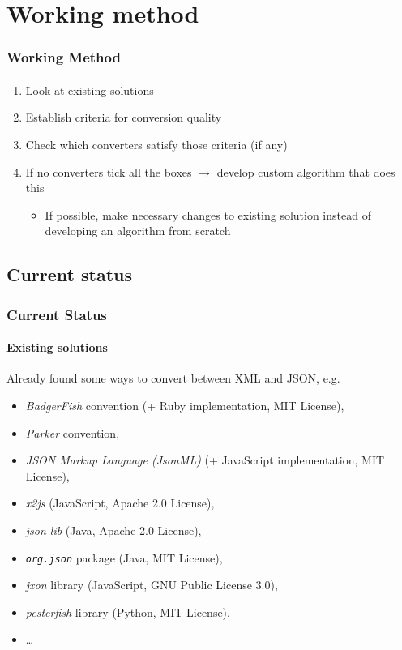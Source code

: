 \documentclass[
    alternativetitlepage=alternativ,
    cornerlogo=hgi_nds_logo2,
    sectionoverview,
]{rubpresentation}
\begin{document}
\section{Working method}

\begin{frame}
    \frametitle{Working Method}
    \framesubtitle{}
    \begin{enumerate}
        \item{} Look at existing solutions
        \item{} Establish criteria for conversion quality
        \item{} Check which converters satisfy those criteria (if any)
        \item{} If no converters tick all the boxes $\rightarrow$ develop custom algorithm that does this
            \begin{itemize}
                \item{} If possible, make necessary changes to existing solution instead of developing an algorithm from scratch
            \end{itemize}
    \end{enumerate}
\end{frame}

\subsection{Current status}

\begin{frame}
    \frametitle{Current Status}
    \framesubtitle{Existing solutions}
    Already found some ways to convert between XML and JSON, e.g.
    \begin{itemize}
        \item{} \emph{BadgerFish} convention (+ Ruby implementation, MIT License),
        \item{} \emph{Parker} convention,
        \item{} \emph{JSON Markup Language (JsonML)} (+ JavaScript implementation, MIT License),
        \item{} \emph{x2js} (JavaScript, Apache 2.0 License),
        \item{} \emph{json-lib} (Java, Apache 2.0 License),
        \item{} \emph{\texttt{org.json}} package (Java, MIT License),
        \item{} \emph{jxon} library (JavaScript, GNU Public License 3.0),
        \item{} \emph{pesterfish} library (Python, MIT License).
        \item{} \dots
    \end{itemize}
\end{frame}
\end{document}

